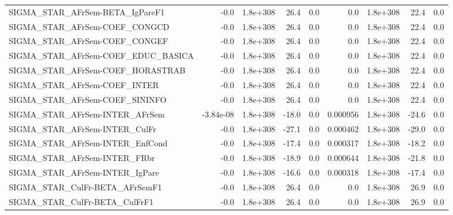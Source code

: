 \begin{tabular}{lrrrrrrrr}
SIGMA\_STAR\_AFrSem-BETA\_IgPareF1      &        -0.0 &     1.8e+308 &    26.4 &      0.0 &        0.0 &    1.8e+308 &         22.4 &           0.0 \\
SIGMA\_STAR\_AFrSem-COEF\_CONGCD        &        -0.0 &     1.8e+308 &    26.4 &      0.0 &        0.0 &    1.8e+308 &         22.4 &           0.0 \\
SIGMA\_STAR\_AFrSem-COEF\_CONGEF        &        -0.0 &     1.8e+308 &    26.4 &      0.0 &        0.0 &    1.8e+308 &         22.4 &           0.0 \\
SIGMA\_STAR\_AFrSem-COEF\_EDUC\_BASICA   &        -0.0 &     1.8e+308 &    26.4 &      0.0 &        0.0 &    1.8e+308 &         22.4 &           0.0 \\
SIGMA\_STAR\_AFrSem-COEF\_HORASTRAB     &        -0.0 &     1.8e+308 &    26.4 &      0.0 &        0.0 &    1.8e+308 &         22.4 &           0.0 \\
SIGMA\_STAR\_AFrSem-COEF\_INTER         &        -0.0 &     1.8e+308 &    26.4 &      0.0 &        0.0 &    1.8e+308 &         22.4 &           0.0 \\
SIGMA\_STAR\_AFrSem-COEF\_SININFO       &        -0.0 &     1.8e+308 &    26.4 &      0.0 &        0.0 &    1.8e+308 &         22.4 &           0.0 \\
SIGMA\_STAR\_AFrSem-INTER\_AFrSem       &   -3.84e-08 &     1.8e+308 &   -18.0 &      0.0 &   0.000956 &    1.8e+308 &        -24.6 &           0.0 \\
SIGMA\_STAR\_AFrSem-INTER\_CulFr        &        -0.0 &     1.8e+308 &   -27.1 &      0.0 &   0.000462 &    1.8e+308 &        -29.0 &           0.0 \\
SIGMA\_STAR\_AFrSem-INTER\_EnfCond      &        -0.0 &     1.8e+308 &   -17.4 &      0.0 &   0.000317 &    1.8e+308 &        -18.2 &           0.0 \\
SIGMA\_STAR\_AFrSem-INTER\_FRbr         &        -0.0 &     1.8e+308 &   -18.9 &      0.0 &   0.000644 &    1.8e+308 &        -21.8 &           0.0 \\
SIGMA\_STAR\_AFrSem-INTER\_IgPare       &        -0.0 &     1.8e+308 &   -16.6 &      0.0 &   0.000318 &    1.8e+308 &        -17.4 &           0.0 \\
SIGMA\_STAR\_CulFr-BETA\_AFrSemF1       &        -0.0 &     1.8e+308 &    26.4 &      0.0 &        0.0 &    1.8e+308 &         26.9 &           0.0 \\
SIGMA\_STAR\_CulFr-BETA\_CulFrF1        &        -0.0 &     1.8e+308 &    26.4 &      0.0 &        0.0 &    1.8e+308 &         26.9 &           0.0 \\

\end{tabular}
